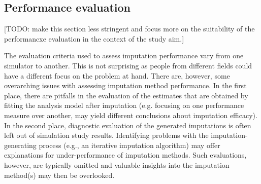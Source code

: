 \documentclass[bimj,fleqn]{w-art}
\begin{document}








\subsection{Performance evaluation}

[TODO: make this section less stringent and focus more on the suitability of the performancxe evaluation in the context of the study aim.]

The evaluation criteria used to assess imputation performance vary from one simulator to another. This is not surprising as people from different fields could have a different focus on the problem at hand. There are, however, some overarching issues with assessing imputation method performance. In the first place, there are pitfalls in the evaluation of the estimates that are obtained by fitting the analysis model after imputation (e.g. focusing on one performance measure over another, may yield different conclusions about imputation efficacy). In the second place, diagnostic evaluation of the generated imputations is often left out of simulation study results. Identifying problems with the imputation-generating process (e.g., an iterative imputation algorithm) may offer explanations for under-performance of imputation methods. Such evaluations, however, are typically omitted and valuable insights into the imputation method(s) may then be overlooked. %
\end{document}
